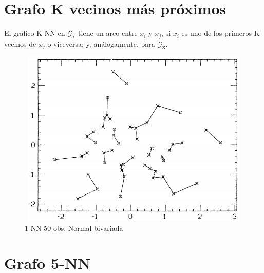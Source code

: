 \documentclass[]{book}
\begin{document}
\section{Grafo K vecinos más
próximos}\label{grafo-k-vecinos-mas-proximos}

El gráfico K-NN en \(\mathcal{G}_{\mathbf{x}}\) tiene un arco entre
\(x_i\) y \(x_j\), si \(x_i\) es uno de los primeros K vecinos de
\(x_j\) o viceversa; y, análogamente, para \(\mathcal{G}_{\mathbf{x}}\).

\begin{figure}

{\centering \includegraphics[width=450,height=320]{1-nn} 

}

\caption{1-NN 50 obs. Normal bivariada}\label{fig:unnamed-chunk-3}
\end{figure}

\section{Grafo 5-NN}\label{grafo-5-nn}
\end{document}

